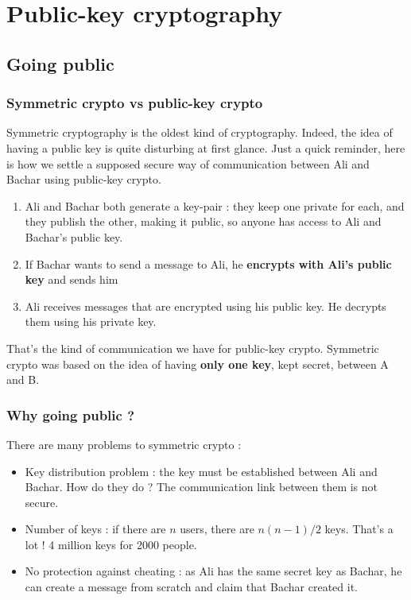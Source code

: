 \documentclass[../Cryptography.tex]{subfiles}
\begin{document}
\chapter{Public-key cryptography}
\section{Going public}
\subsection{Symmetric crypto vs public-key crypto}
Symmetric cryptography is the oldest kind of cryptography. Indeed, the idea of having a public key is quite disturbing at first glance. Just a quick reminder, here is how we settle a supposed secure way of communication between Ali and Bachar using public-key crypto.

\begin{enumerate}
    \item Ali and Bachar both generate a key-pair : they keep one private for each, and they publish the other, making it public, so anyone has access to Ali and Bachar's public key.
    \item If Bachar wants to send a message to Ali, he \textbf{encrypts with Ali's public key} and sends him
    \item Ali receives messages that are encrypted using his public key. He decrypts them using his private key.
\end{enumerate}

That's the kind of communication we have for public-key crypto. Symmetric crypto was based on the idea of having \textbf{only one key}, kept secret, between A and B. 
\subsection{Why going public ?}
There are many problems to symmetric crypto :
\begin{itemize}
    \item Key distribution problem : the key must be established between Ali and Bachar. How do they do ? The communication link between them is not secure.
    \item Number of keys : if there are $n$ users, there are $n(n-1)/2$ keys. That's a lot ! 4 million keys for 2000 people.
    \item No protection against cheating : as Ali has the same secret key as Bachar, he can create a message from scratch and claim that Bachar created it.
\end{itemize}
\end{document}
